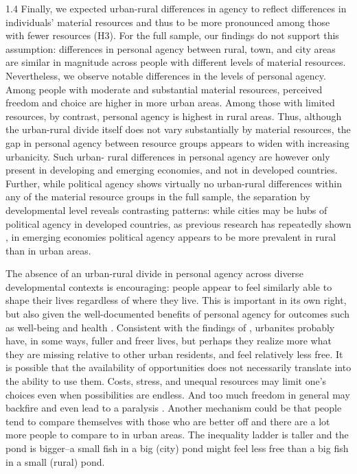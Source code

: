 \documentclass[10pt, letterpaper]{article}
\begin{document}
\begin{spacing}{1.4}
Finally, we expected urban-rural differences in agency to reflect differences in individuals' material
resources and thus to be more pronounced among those with fewer resources (H3). For the full
sample, our findings do not support this assumption: differences in personal agency between rural,
town, and city areas are similar in magnitude across people with different levels of material resources.
Nevertheless, we observe notable differences in the levels of personal agency. Among people with
moderate and substantial material resources, perceived freedom and choice are higher in more urban
areas. Among those with limited resources, by contrast, personal agency is highest in rural areas.
Thus, although the urban-rural divide itself does not vary substantially by material resources, the gap
in personal agency between resource groups appears to widen with increasing urbanicity. Such urban-
rural differences in personal agency are however only present in developing and emerging economies,
and not in developed countries. Further, while political agency shows virtually no urban-rural
differences within any of the material resource groups in the full sample, the separation by
developmental level reveals contrasting patterns: while cities may be hubs of political agency in
developed countries, as previous research has repeatedly shown
\citep[e.g.,][]{garcia2024they,luukkonen2022urbanisation,rowland2024political},
in emerging economies political agency appears to be
more prevalent in rural than in urban areas.

The absence of an urban-rural divide in personal agency across diverse developmental contexts is
encouraging: people appear to feel similarly able to shape their lives regardless of where they live.
This is important in its own right, but also given the well-documented benefits of personal agency for
outcomes such as well-being and health
\citep[e.g.,][]{martela2026autonomy,nguyen2020beyond,steckermeier2024}.
 Consistent with the findings of \citet{aok24swls}, urbanites probably have, in some ways,
fuller and freer lives, but perhaps they realize more what they are missing relative to other urban
residents, and feel relatively less free. It is possible that the availability of opportunities does not
necessarily translate into the ability to use them. Costs, stress, and unequal resources may limit one's
choices even when possibilities are endless. And too much freedom in general may backfire and even
lead to a paralysis \citep{schwartz04}. Another mechanism could be that people tend to compare
themselves with those who are better off \citep{frey02s} and there are a lot more people to
compare to in urban areas. The inequality ladder is taller and the pond is bigger--a small fish in a big
(city) pond might feel less free than a big fish in a small (rural) pond.


\end{spacing}
\end{document}
